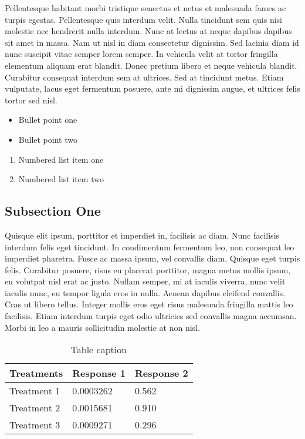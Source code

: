 \documentclass[preprint,12pt]{elsarticle}
\begin{document}
Pellentesque habitant morbi tristique senectus et netus et malesuada fames ac turpis egestas. Pellentesque quis interdum velit. Nulla tincidunt sem quis nisi molestie nec hendrerit nulla interdum. Nunc at lectus at neque dapibus dapibus sit amet in massa. Nam ut nisl in diam consectetur dignissim. Sed lacinia diam id nunc suscipit vitae semper lorem semper. In vehicula velit at tortor fringilla elementum aliquam erat blandit. Donec pretium libero et neque vehicula blandit. Curabitur consequat interdum sem at ultrices. Sed at tincidunt metus. Etiam vulputate, lacus eget fermentum posuere, ante mi dignissim augue, et ultrices felis tortor sed nisl.

\begin{itemize}
\item Bullet point one
\item Bullet point two
\end{itemize}

\begin{enumerate}
\item Numbered list item one
\item Numbered list item two
\end{enumerate}

\subsection{Subsection One}

Quisque elit ipsum, porttitor et imperdiet in, facilisis ac diam. Nunc facilisis interdum felis eget tincidunt. In condimentum fermentum leo, non consequat leo imperdiet pharetra. Fusce ac massa ipsum, vel convallis diam. Quisque eget turpis felis. Curabitur posuere, risus eu placerat porttitor, magna metus mollis ipsum, eu volutpat nisl erat ac justo. Nullam semper, mi at iaculis viverra, nunc velit iaculis nunc, eu tempor ligula eros in nulla. Aenean dapibus eleifend convallis. Cras ut libero tellus. Integer mollis eros eget risus malesuada fringilla mattis leo facilisis. Etiam interdum turpis eget odio ultricies sed convallis magna accumsan. Morbi in leo a mauris sollicitudin molestie at non nisl.

\begin{table}[h]
\centering
\begin{tabular}{l l l}
\hline
\textbf{Treatments} & \textbf{Response 1} & \textbf{Response 2}\\
\hline
Treatment 1 & 0.0003262 & 0.562 \\
Treatment 2 & 0.0015681 & 0.910 \\
Treatment 3 & 0.0009271 & 0.296 \\
\hline
\end{tabular}
\caption{Table caption}
\end{table}
\end{document}
